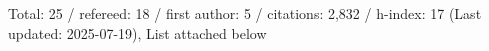 Total: 25 / refereed: 18 / first author: 5 / citations: 2,832 / h-index: 17 (Last updated: 2025-07-19), List attached below